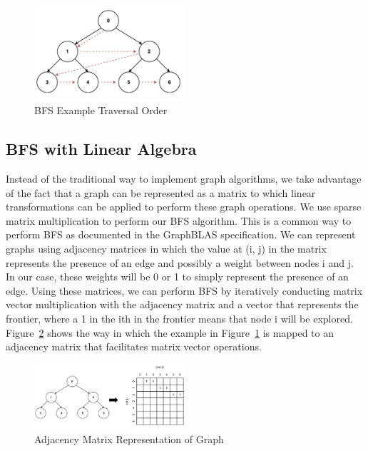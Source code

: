 \documentclass[10pt]{article}
\begin{document}
\begin{figure}[h!]
  \centering
  \includegraphics[width=0.5\textwidth]{bfs_graph.png}
  \caption{BFS Example Traversal Order}
  \label{fig:bfs_graph}
\end{figure}

\subsection{BFS with Linear Algebra}
\noindent Instead of the traditional way to implement graph algorithms, we take advantage of the fact that a graph can 
be represented as a matrix to which linear transformations can be applied to perform these graph operations.
We use sparse matrix multiplication to perform our BFS algorithm. This is a common way to perform BFS as documented
in the GraphBLAS specification. We can represent graphs using adjacency matrices in which the value at (i, j) in the 
matrix represents the presence of an edge and possibly a weight between nodes i and j. In our case, these weights will
be 0 or 1 to simply represent the presence of an edge. Using these matrices, we can perform BFS by iteratively conducting 
matrix vector multiplication with the adjacency matrix and a vector that represents the frontier, where a 1 in the ith 
in the frontier means that node i will be explored. Figure~\ref{fig:adj_matrix} shows the way in which the example in 
Figure~\ref{fig:bfs_graph} is mapped to an adjacency matrix that facilitates matrix vector operations.

\begin{figure}[h!]
  \centering
  \includegraphics[width=0.5\textwidth]{adj_matrix.png}
  \caption{Adjacency Matrix Representation of Graph}
  \label{fig:adj_matrix}
\end{figure}
\end{document}
